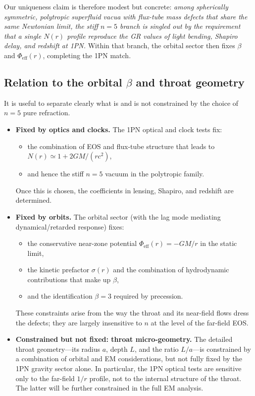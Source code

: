 \documentclass[11pt]{article}
\begin{document}
Our uniqueness claim is therefore modest but concrete:
\emph{among spherically symmetric, polytropic superfluid vacua with
flux-tube mass defects that share the same Newtonian limit, the stiff
$n=5$ branch is singled out by the requirement that a single $N(r)$ profile
reproduce the GR values of light bending, Shapiro delay, and redshift at
1PN.}
Within that branch, the orbital sector then fixes $\beta$ and
$\Phi_{\mathrm{eff}}(r)$, completing the 1PN match.


\subsection{Relation to the orbital \texorpdfstring{$\beta$}{beta} and throat geometry}
\label{subsec:degeneracies-beta-L}

It is useful to separate clearly what is and is not constrained by the
choice of $n=5$ pure refraction.

\begin{itemize}
  \item \textbf{Fixed by optics and clocks.}
        The 1PN optical and clock tests fix:
        \begin{itemize}
          \item the combination of EOS and flux-tube structure that leads
                to $N(r)\simeq 1 + 2GM/(r c^2)$,
          \item and hence the stiff $n=5$ vacuum in the polytropic family.
        \end{itemize}
        Once this is chosen, the coefficients in lensing, Shapiro, and
        redshift are determined.

  \item \textbf{Fixed by orbits.}
        The orbital sector (with the lag mode mediating dynamical/retarded
        response) fixes:
        \begin{itemize}
          \item the conservative near-zone potential
                $\Phi_{\mathrm{eff}}(r)=-GM/r$ in the static limit,
          \item the kinetic prefactor $\sigma(r)$ and the combination of
                hydrodynamic contributions that make up $\beta$,
          \item and the identification $\beta = 3$ required by
                precession.
        \end{itemize}
        These constraints arise from the way the throat and its near-field
        flows dress the defects; they are largely insensitive to $n$ at
        the level of the far-field EOS.

  \item \textbf{Constrained but not fixed: throat micro-geometry.}
        The detailed throat geometry---its radius $a$, depth $L$, and the
        ratio $L/a$---is constrained by a combination of orbital and EM
        considerations, but not fully fixed by the 1PN gravity sector
        alone.
        In particular, the 1PN optical tests are sensitive only to the
        far-field $1/r$ profile, not to the internal structure of the
        throat.  The latter will be further constrained in the full EM
        analysis.
\end{itemize}
\end{document}
